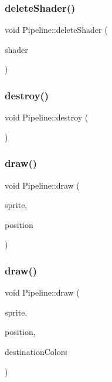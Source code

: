 \subsubsection{\texorpdfstring{delete\+Shader()}{deleteShader()}}
{\footnotesize\ttfamily void Pipeline\+::delete\+Shader (\begin{DoxyParamCaption}\item[{G\+Luint $\ast$}]{shader }\end{DoxyParamCaption})\hspace{0.3cm}{\ttfamily [private]}}

\mbox{\label{class_pipeline_a3059fbbdb1821ccd7deee8bf0d49ba77}} 
\subsubsection{\texorpdfstring{destroy()}{destroy()}}
{\footnotesize\ttfamily void Pipeline\+::destroy (\begin{DoxyParamCaption}{ }\end{DoxyParamCaption})}

\mbox{\label{class_pipeline_ab5881644be6d1061be1cbc90a6724681}} 
\subsubsection{\texorpdfstring{draw()}{draw()}\hspace{0.1cm}{\footnotesize\ttfamily [1/2]}}
{\footnotesize\ttfamily void Pipeline\+::draw (\begin{DoxyParamCaption}\item[{\hyperlink{class_sprite}{Sprite} $\ast$}]{sprite,  }\item[{glm\+::vec2}]{position }\end{DoxyParamCaption})}

\mbox{\label{class_pipeline_a69e2a417b8d5777c11d5bf36d0048dad}} 
\subsubsection{\texorpdfstring{draw()}{draw()}\hspace{0.1cm}{\footnotesize\ttfamily [2/2]}}
{\footnotesize\ttfamily void Pipeline\+::draw (\begin{DoxyParamCaption}\item[{\hyperlink{class_sprite}{Sprite} $\ast$}]{sprite,  }\item[{glm\+::vec2}]{position,  }\item[{std\+::vector$<$ glm\+::vec3 $>$}]{destination\+Colors }\end{DoxyParamCaption})}


